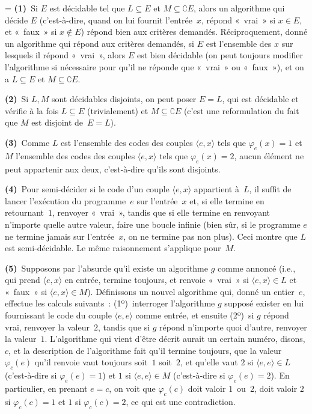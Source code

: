 \documentclass[12pt,a4paper]{article}
\theoremstyle{definition}
\newif\ifcorrige
\newenvironment{corrige}%
{\ifcorrige\relax\else\setbox0=\vbox\bgroup\fi%
\smallbreak\footnotesize\noindent{\underbar{\textit{Corrigé.}}\quad}}
{{\hbox{}\nobreak\hfill\checkmark}%
\ifcorrige\relax\else\egroup\fi\par}
\begin{document}
\begin{corrige}
\textbf{(1)} Si $E$ est décidable tel que $L \subseteq E$ et $M
\subseteq \complement E$, alors un algorithme qui décide $E$
(c'est-à-dire, quand on lui fournit l'entrée $x$, répond « vrai » si
$x\in E$, et « faux » si $x \not\in E$) répond bien aux critères
demandés.  Réciproquement, donné un algorithme qui répond aux critères
demandés, si $E$ est l'ensemble des $x$ sur lesquels il répond
« vrai », alors $E$ est bien décidable (on peut toujours modifier
l'algorithme si nécessaire pour qu'il ne réponde que « vrai » ou
« faux »), et on a $L \subseteq E$ et $M \subseteq \complement E$.

\textbf{(2)} Si $L,M$ sont décidables disjoints, on peut poser $E =
L$, qui est décidable et vérifie à la fois $L \subseteq E$
(trivialement) et $M \subseteq \complement E$ (c'est une reformulation
du fait que $M$ est disjoint de $E=L$).

\textbf{(3)} Comme $L$ est l'ensemble des codes des couples $\langle
e,x\rangle$ tels que $\varphi_e(x) = 1$ et $M$ l'ensemble des codes
des couples $\langle e,x\rangle$ tels que $\varphi_e(x) = 2$, aucun
élément ne peut appartenir aux deux, c'est-à-dire qu'ils sont
disjoints.

\textbf{(4)} Pour semi-décider si le code d'un couple $\langle
e,x\rangle$ appartient à $L$, il suffit de lancer l'exécution du
programme $e$ sur l'entrée $x$ et, si elle termine en retournant $1$,
renvoyer « vrai », tandis que si elle termine en renvoyant n'importe
quelle autre valeur, faire une boucle infinie (bien sûr, si le
programme $e$ ne termine jamais sur l'entrée $x$, on ne termine pas
non plus).  Ceci montre que $L$ est semi-décidable.  Le même
raisonnement s'applique pour $M$.

\textbf{(5)} Supposons par l'absurde qu'il existe un algorithme $g$
comme annoncé (i.e., qui prend $\langle e,x\rangle$ en entrée, termine
toujours, et renvoie « vrai » si $\langle e,x\rangle\in L$ et « faux »
si $\langle e,x\rangle \in M$).  Définissons un nouvel algorithme qui,
donné un entier $e$, effectue les calculs suivants : (1º) interroger
l'algorithme $g$ supposé exister en lui fournissant le code du couple
$\langle e,e\rangle$ comme entrée, et ensuite (2º) si $g$ répond vrai,
renvoyer la valeur $2$, tandis que si $g$ répond n'importe quoi
d'autre, renvoyer la valeur $1$.  L'algorithme qui vient d'être décrit
aurait un certain numéro, disons, $c$, et la description de
l'algorithme fait qu'il termine toujours, que la valeur $\varphi_c(e)$
qu'il renvoie vaut toujours soit $1$ soit $2$, et qu'elle vaut $2$ si
$\langle e,e\rangle \in L$ (c'est-à-dire si $\varphi_e(e) = 1$) et $1$
si $\langle e,e\rangle \in M$ (c'est-à-dire si $\varphi_e(e) = 2$).
En particulier, en prenant $e=c$, on voit que $\varphi_c(c)$ doit
valoir $1$ ou $2$, doit valoir $2$ si $\varphi_c(c) = 1$ et $1$ si
$\varphi_c(c) = 2$, ce qui est une contradiction.


\end{corrige}
\end{document}
